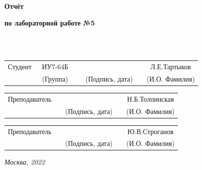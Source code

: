 \begin{center}
	\vspace{2cm}
	{\bf\huge Отчёт\par}
	{\bf\Large по лабораторной работе №5\par}
	\vspace{0.5cm}
\end{center}


\noindent
{}
\\


\noindent
{}
\\

\vspace{1.5cm}
\noindent
\begin{tabular}{l c c c c c}
	Студент      & ~ИУ7-64Б~               & \hspace{2.5cm} & \hspace{3cm}                 & &  Л.Е.Тартыков \\\cline{2-2}\cline{4-4} \cline{6-6}
	\hspace{3cm} & {\footnotesize(Группа)} &                & {\footnotesize(Подпись, дата)} & & {\footnotesize(И.О. Фамилия)}
\end{tabular}

\noindent
\begin{tabular}{l c c c c}
	Преподаватель & \hspace{5cm}   & \hspace{3cm}                 & & Н.Б.Толпинская \\\cline{3-3} \cline{5-5} 
	\hspace{3cm}  &                & {\footnotesize(Подпись, дата)} & & {\footnotesize(И.О. Фамилия)}
\end{tabular}

\noindent
\begin{tabular}{l c c c c}
	Преподаватель & \hspace{5cm}   & \hspace{3cm}                 & & Ю.В.Строганов \\\cline{3-3} \cline{5-5} 
	\hspace{3cm}  &                & {\footnotesize(Подпись, дата)} & & {\footnotesize(И.О. Фамилия)}
\end{tabular}

\begin{center}	
	\vfill
	\large \textit {Москва, 2022}
\end{center}

\thispagestyle {empty}
\pagebreak